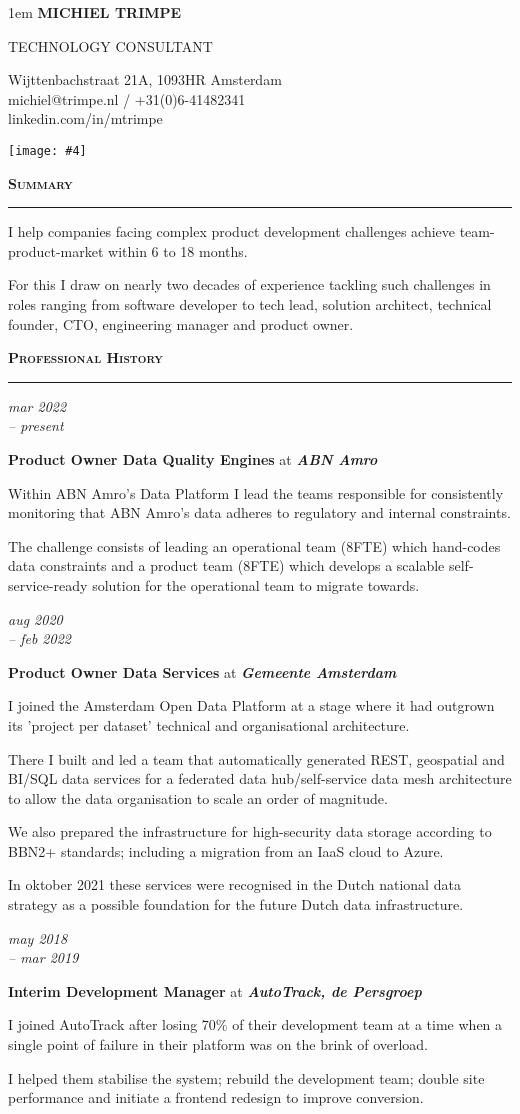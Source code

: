 \documentclass[a4paper,11pt]{article}
\newlength{\sectionindent}
\newlength{\detailsheigth}
\newlength{\marginwidth}
\newlength{\sectionheaderindent}
\newcommand{\personaldetails}[4]{
    \begin{minipage}[t][\detailsheigth]{\dimexpr\textwidth-\detailsheigth-2pt}
        \vspace{0pt}
        \begin{minipage}[t]{\textwidth}\openup 1em
            {\huge\textbf{\MakeUppercase{#1}}}
            \par
            {\LARGE\textsc{\MakeUppercase{#2}}}
        \end{minipage}
        \vfill
        \begin{minipage}[b]{\textwidth}
            #3
        \end{minipage}
    \end{minipage}
    \hfill
    \begin{minipage}[t]{\detailsheigth}
        \vspace{0pt}
        \raggedleft 
        \texttt{[image: \#4]}
    \end{minipage}}
\newcommand{\sectionheader}[1]{
    \vspace{1mm}
    \begin{minipage}[t]{\textwidth}
        \hspace{\sectionheaderindent}\textbf{\textsc{#1}}\\[-8pt\baselineskip] 
        \rule{\textwidth}{1pt}
    \end{minipage}\strut\vspace{3mm}}
\newcommand{\margin}[1]{
    \begin{minipage}[t]{\dimexpr\sectionindent-\marginwidth}
        \begin{flushright}
            \textit{#1}
        \end{flushright}
    \end{minipage}
    \hspace{\marginwidth}}
\newenvironment{descriptionsection}{
    \begingroup
    \setlength{\parskip}{4pt plus 2pt minus 1pt} 
}{
    \endgroup
}
\newcommand{\summaryentry}[1]{
    \margin{}
    \begin{minipage}[t]{\dimexpr\textwidth-\sectionindent}
        \begin{descriptionsection}
            #1
        \end{descriptionsection}
    \end{minipage}}
\newcommand{\jobentry}[4]{
    \margin{#1}
    \begin{minipage}[t]{\dimexpr\textwidth-\sectionindent}
        \textbf{#2} at \textit{\textbf{#3}}\\[1pt]
        \begin{descriptionsection}
        #4
        \end{descriptionsection}
    \end{minipage}\vspace{4pt}}
\begin{document}
\personaldetails
    {Michiel Trimpe}
    {Technology Consultant}
    {
        Wijttenbachstraat 21A, 1093HR Amsterdam\\
        michiel@trimpe.nl / +31(0)6-41482341\\
        linkedin.com/in/mtrimpe
    }
    {./profile.jpg}

\sectionheader{Summary}
\summaryentry{
I help companies facing complex product development challenges achieve team-product-market within 6 to 18 months.

For this I draw on nearly two decades of experience tackling such challenges in roles ranging from software developer to tech lead, solution architect, technical founder, CTO, engineering manager and product owner.}

\sectionheader{Professional History}
\jobentry{mar 2022\\-- present}{Product Owner Data Quality Engines}{ABN Amro}{
Within ABN Amro's Data Platform I lead the teams responsible for consistently monitoring that ABN Amro’s data adheres to regulatory and internal constraints. 

The challenge consists of leading an operational team (8FTE) which hand-codes data constraints and a product team (8FTE) which develops a scalable self-service-ready solution for the operational team to migrate towards.}

\jobentry{aug 2020\\-- feb 2022}{Product Owner Data Services}{Gemeente Amsterdam}{
I joined the Amsterdam Open Data Platform at a stage where it had outgrown its 'project per dataset' technical and organisational architecture.

There I built and led a team that automatically generated REST, geospatial and BI/SQL data services for a federated data hub/self-service data mesh architecture to allow the data organisation to scale an order of magnitude.

We also prepared the infrastructure for high-security data storage according to BBN2+ standards; including a migration from an IaaS cloud to Azure.

In oktober 2021 these services were recognised in the Dutch national data strategy as a possible foundation for the future Dutch data infrastructure.}

\jobentry{may 2018\\-- mar 2019}{Interim Development Manager}{AutoTrack, de Persgroep}{
I joined AutoTrack after losing 70\% of their development team at a time when a single point of failure in their platform was on the brink of overload.

I helped them stabilise the system; rebuild the development team; double site performance and initiate a frontend redesign to improve conversion.}
\end{document}
